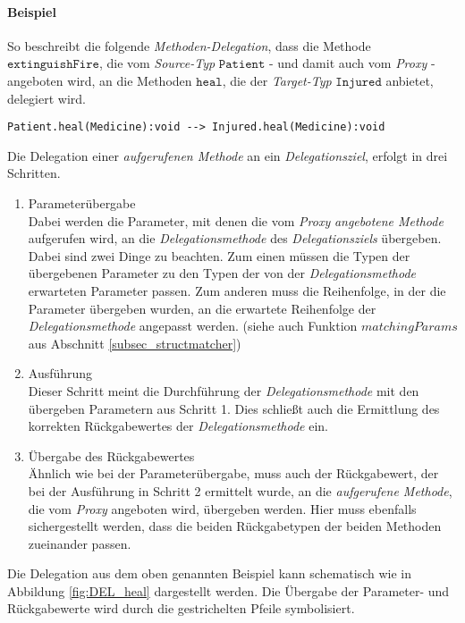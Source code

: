 \paragraph{Beispiel} So beschreibt die folgende \emph{Methoden-Delegation}, dass die Methode $\texttt{extinguishFire}$, die vom \emph{Source-Typ} $\texttt{Patient}$ - und damit auch vom \emph{Proxy} - angeboten wird, an die Methoden $\texttt{heal}$, die der \emph{Target-Typ} $\texttt{Injured}$ anbietet, delegiert wird.
\begin{lstlisting}[style = dsl, caption = Einfache Methoden-Delegation, captionpos = b]
	Patient.heal(Medicine):void --> Injured.heal(Medicine):void
\end{lstlisting}
\noindent
Die Delegation einer \emph{aufgerufenen Methode} an ein \emph{Delegationsziel}, erfolgt in drei Schritten.
\begin{enumerate}
\item Parameterübergabe\\
Dabei werden die Parameter, mit denen die vom \emph{Proxy} \emph{angebotene Methode} aufgerufen wird, an die \emph{Delegationsmethode} des \emph{Delegationsziels} übergeben. Dabei sind zwei Dinge zu beachten. Zum einen müssen die Typen der übergebenen Parameter zu den Typen der von der \emph{Delegationsmethode} erwarteten Parameter passen. Zum anderen muss die Reihenfolge, in der die Parameter übergeben wurden, an die erwartete Reihenfolge der \emph{Delegationsmethode} angepasst werden. (siehe auch Funktion $\mathit{matchingParams}$ aus Abschnitt \ref{subsec_structmatcher})
\item Ausführung\\
Dieser Schritt meint die Durchführung der \emph{Delegationsmethode} mit den übergeben Parametern aus Schritt 1. Dies schließt auch die Ermittlung des korrekten Rückgabewertes der \emph{Delegationsmethode} ein.
\item Übergabe des Rückgabewertes\\
Ähnlich wie bei der Parameterübergabe, muss auch der Rückgabewert, der bei der Ausführung in Schritt 2 ermittelt wurde, an die \emph{aufgerufene Methode}, die vom \emph{Proxy} angeboten wird, übergeben werden. Hier muss ebenfalls sichergestellt werden, dass die beiden Rückgabetypen der beiden Methoden zueinander passen.
\end{enumerate}
Die Delegation aus dem oben genannten Beispiel kann schematisch wie in Abbildung \ref{fig:DEL_heal} dargestellt werden. Die Übergabe der Parameter- und Rückgabewerte wird durch die gestrichelten Pfeile symbolisiert.
